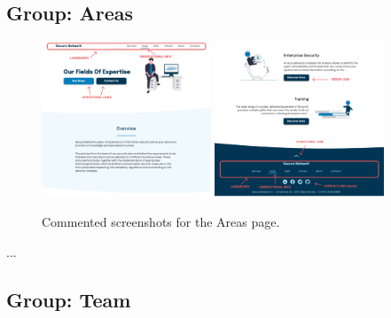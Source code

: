 \documentclass[12pt]{report}
\begin{document}
\subsection{Group: Areas}

\begin{figure}[H]
	\centering
	\includegraphics[width=0.45\textwidth]{high_fid_wireframes/all_areas/1.png}
	\includegraphics[width=0.45\textwidth]{high_fid_wireframes/all_areas/2.png}
	\caption{Commented screenshots for the Areas page.}
\end{figure}
\color{white}...\color{black}

\subsection{Group: Team}
\end{document}
